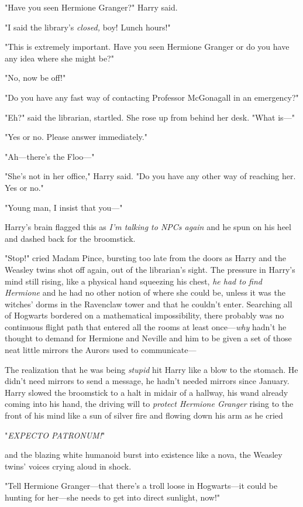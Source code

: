 "Have you seen Hermione Granger?" Harry said.

"I said the library's \emph{closed,} boy! Lunch hours!"

"This is extremely important. Have you seen Hermione Granger or do you have any idea where she might be?"

"No, now be off!"

"Do you have any fast way of contacting Professor McGonagall in an emergency?"

"Eh?" said the librarian, startled. She rose up from behind her desk. "What is---"

"Yes or no. Please answer immediately."

"Ah---there's the Floo---"

"She's not in her office," Harry said. "Do you have any other way of reaching her. Yes or no."

"Young man, I insist that you---"

Harry's brain flagged this as \emph{I'm talking to NPCs again} and he spun on his heel and dashed back for the broomstick.

"Stop!" cried Madam Pince, bursting too late from the doors as Harry and the Weasley twins shot off again, out of the librarian's sight. The pressure in Harry's mind still rising, like a physical hand squeezing his chest, \emph{he had to find Hermione} and he had no other notion of where she could be, unless it was the witches' dorms in the Ravenclaw tower and that he couldn't enter. Searching all of Hogwarts bordered on a mathematical impossibility, there probably was no continuous flight path that entered all the rooms at least once---\emph{why} hadn't he thought to demand for Hermione and Neville and him to be given a set of those neat little mirrors the Aurors used to communicate---

The realization that he was being \emph{stupid} hit Harry like a blow to the stomach. He didn't need mirrors to send a message, he hadn't needed mirrors since January. Harry slowed the broomstick to a halt in midair of a hallway, his wand already coming into his hand, the driving will to \emph{protect Hermione Granger} rising to the front of his mind like a sun of silver fire and flowing down his arm as he cried

"\emph{EXPECTO PATRONUM!}"

and the blazing white humanoid burst into existence like a nova, the Weasley twins' voices crying aloud in shock.

"Tell Hermione Granger---that there's a troll loose in Hogwarts---it could be hunting for her---she needs to get into direct sunlight, now!"


